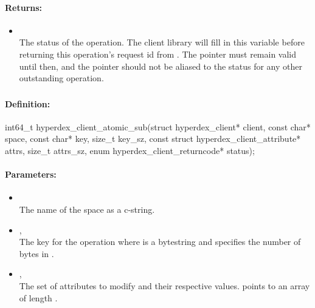\paragraph{Returns:}
\begin{itemize}[noitemsep]
\item {}\\
The status of the operation.  The client library will fill in this variable before returning this operation's request id from .  The pointer must remain valid until then, and the pointer should not be aliased to the status for any other outstanding operation.
\end{itemize}

\pagebreak
\subsubsection{}
\label{api:c:atomic_sub}


\paragraph{Definition:}
\begin{ccode}
int64_t hyperdex_client_atomic_sub(struct hyperdex_client* client,
        const char* space,
        const char* key, size_t key_sz,
        const struct hyperdex_client_attribute* attrs, size_t attrs_sz,
        enum hyperdex_client_returncode* status);
\end{ccode}

\paragraph{Parameters:}
\begin{itemize}[noitemsep]
\item {}\\
The name of the space as a c-string.
\item {}, \\
The key for the operation where  is a bytestring and  specifies the number of bytes in .
\item {}, \\
The set of attributes to modify and their respective values.   points to an array of length .
\end{itemize}

